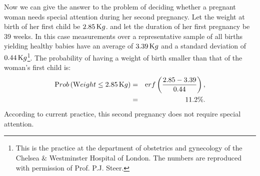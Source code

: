 \def\w{2.85}\def\av{3.39}\def\st{0.44}
 Now we can give the answer to the problem of deciding
whether a pregnant woman needs special attention during her second
pregnancy. Let the weight at birth of her first child be $\w\kg$.
and let the duration of her first pregnancy be 39 weeks. In this
case measurements over a representative sample of all births
yielding healthy babies have an average of $\av\kg$ and a standard
deviation of $\st\kg$\footnote{\label{ft:steer}This is the
practice at the department of obstetrics and gynecology of the
Chelsea $\&$ Westminster Hospital of London. The numbers are
reproduced with permission of Prof. P.J. Steer.}. The probability
of having a weight of birth smaller than that of the woman's first
child is:
\begin{eqnarray*}
\prob\left(\mathop{\textrm Weight}\le \w\kg \right) & = &
\erf\left({\w-\av\over\st}\right),\\ & = & 11.2\%.
\end{eqnarray*}
According to current practice, this second pregnancy does not
require special attention.

